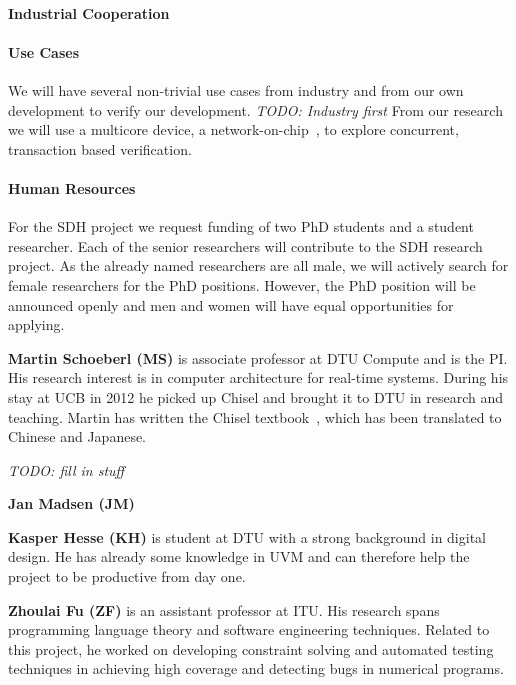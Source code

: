 \documentclass[fleqn,12pt]{article}
\newcommand{\todo}[1]{{\it TODO: #1}}
\begin{document}
\paragraph*{Industrial Cooperation}


\paragraph*{Use Cases}

We will have several non-trivial use cases from industry and from our own development to verify
our development. \todo{Industry first}
From our research we will use a multicore device, a network-on-chip~\cite{s4noc:nocarc2019},
to explore concurrent, transaction based verification.

\paragraph*{Human Resources}

For the SDH project we request funding of two PhD students and a student researcher.
Each of the senior researchers will contribute to the SDH research project.
%
%
As the already named researchers are all male, we will actively search
for female researchers for the PhD positions.
However, the PhD position will be announced openly and men and women
will have equal opportunities for applying.


{\bf Martin Schoeberl (MS)} is associate professor at DTU Compute and is the PI.
His research interest is in computer architecture for real-time systems. During his stay
at UCB in 2012 he picked up Chisel and brought it to DTU in research and teaching.
Martin has written the Chisel textbook~\cite{chisel:book}, which has been translated
to Chinese and Japanese.

\todo{fill in stuff}

{\bf Jan Madsen (JM)} 

{\bf Kasper Hesse (KH)} is student at DTU with a strong background in digital design.
He has already some knowledge in UVM and can therefore help the project to be productive
from day one.

{\bf Zhoulai Fu (ZF)} is an assistant professor at ITU. His research
spans programming language theory and software engineering
techniques. Related to this project, he worked on developing
constraint solving and automated testing techniques in achieving high
coverage and detecting bugs in numerical programs.
\end{document}

